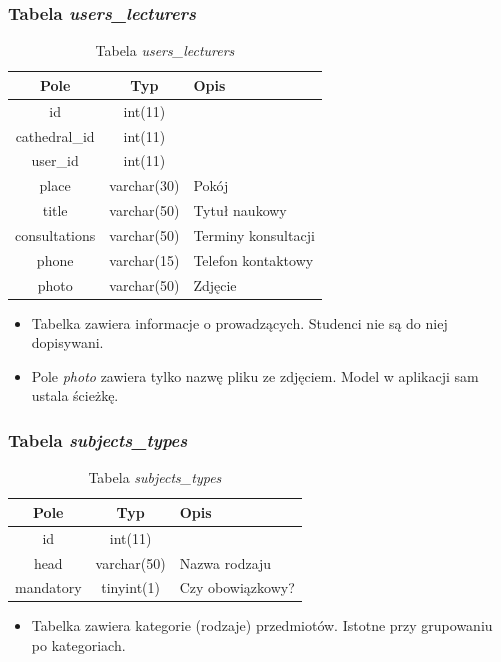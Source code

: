 \documentclass[a4paper,12pt,oneside]{report}
\begin{document}
\newpage
\subsubsection{Tabela \emph{users\_lecturers}}
\label{subsub:users_lecturers}

\begin{table}[h]
  \centering
  \begin{tabular}{|c|c|l|}\hline
  Pole & Typ & Opis \\\hline
  id            & int(11)     & \\
  cathedral\_id & int(11)     & \\
  user\_id      & int(11)     & \\
  place         & varchar(30) & Pokój \\
  title         & varchar(50) & Tytuł naukowy \\
  consultations & varchar(50) & Terminy konsultacji \\
  phone         & varchar(15) & Telefon kontaktowy \\
  photo         & varchar(50) & Zdjęcie \\\hline
  \end{tabular}
  \caption{Tabela \emph{users\_lecturers}\label{tab:users_lecturers}}
\end{table}
\begin{itemize}
  \item Tabelka zawiera informacje o prowadzących. Studenci nie są do niej dopisywani.
  \item Pole \emph{photo} zawiera tylko nazwę pliku ze zdjęciem. Model w aplikacji sam ustala ścieżkę.
\end{itemize}

\subsubsection{Tabela \emph{subjects\_types}}
\label{subsub:subjects_types}

\begin{table}[h]
  \centering
  \begin{tabular}{|c|c|l|}\hline
  Pole & Typ & Opis \\\hline
  id        & int(11)     & \\
  head      & varchar(50) & Nazwa rodzaju \\
  mandatory & tinyint(1)  & Czy obowiązkowy? \\\hline
  \end{tabular}
  \caption{Tabela \emph{subjects\_types}\label{tab:subjects_types}}
\end{table}
\begin{itemize}
  \item Tabelka zawiera kategorie (rodzaje) przedmiotów. Istotne przy grupowaniu po kategoriach.
\end{itemize}
\end{document}

